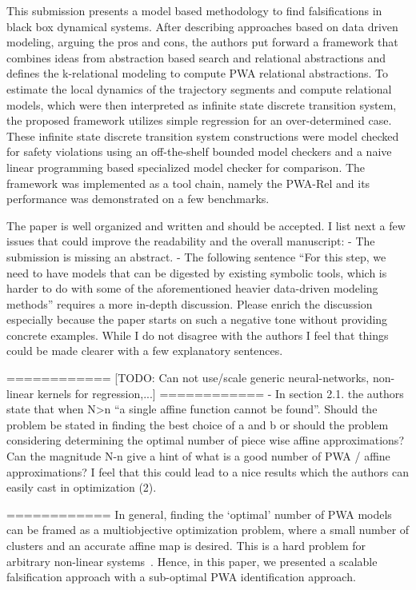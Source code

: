 This submission presents a model based methodology to find falsifications in
black box dynamical systems. After describing approaches based on data driven
modeling, arguing the pros and cons, the authors put forward a framework that
combines ideas from abstraction based search and relational abstractions and
defines the k-relational modeling to compute PWA relational abstractions. To
estimate the local dynamics of the trajectory segments and compute relational
models, which were then interpreted as infinite state discrete transition
system, the proposed framework utilizes simple regression for an
over-determined case. These infinite state discrete transition system
constructions were model checked for safety violations using an off-the-shelf
bounded model checkers and a naive linear programming based specialized model
checker for comparison. The framework was implemented as a tool chain, namely
the PWA-Rel and its performance was demonstrated on a few benchmarks.

The paper is well organized and written and should be accepted. I list next a
few issues that could improve the readability and the overall manuscript:
- The submission is missing an abstract.
-  The following sentence “For this step, we need to have models that can be
digested by existing symbolic tools, which is harder to do with some of the
aforementioned heavier data-driven modeling methods” requires a more in-depth
discussion. Please enrich the discussion especially because the paper starts on
such a negative tone without providing concrete examples. While I do not
disagree with the authors I feel that things could be made clearer with a few
explanatory sentences.

   ============
   [TODO: Can not use/scale generic neural-networks, non-linear
   kernels for regression,...]
   ============
- In section 2.1. the authors state that when N>n “a single affine function
cannot be found”. Should the problem be stated in finding the best choice of
a and b or should the problem considering determining the optimal number of
piece wise affine approximations? Can the magnitude N-n give a hint of what is
a good number of PWA / affine approximations? I feel that this could lead to a
nice results which the authors can easily cast in optimization (2).

   ============
   In general, finding the `optimal' number of PWA models can be
   framed as a multiobjective optimization problem, where a small
   number of clusters and an accurate affine map is desired. This is a
   hard problem for arbitrary non-linear systems~\cite{[TODO]}.
   Hence, in this paper, we presented a scalable falsification approach
   with a sub-optimal PWA identification approach.

